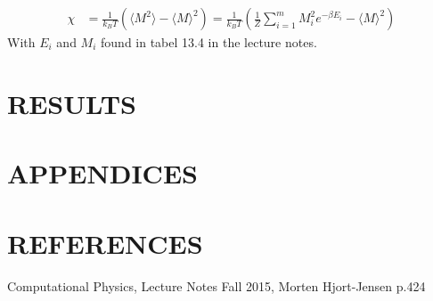 \documentclass[a4paper]{article}
\begin{document}
\begin{align*}
\chi &= \frac{1}{k_BT} \left( \langle M^2 \rangle - \langle M \rangle ^2 \right)
= \frac{1}{k_BT} \left( \frac{1}{Z} \sum_{i=1}^{m} M_i^2 e^{-\beta E_i} - \langle M \rangle ^2 \right)
\end{align*}
With $E_i$ and $M_i$ found in tabel 13.4 in the lecture notes.


\section{RESULTS}



\section{APPENDICES}




\section{REFERENCES}
\begin{thebibliography}{9}
	Computational Physics, Lecture Notes Fall 2015, Morten Hjort-Jensen p.424
\end{thebibliography}




\end{document}
